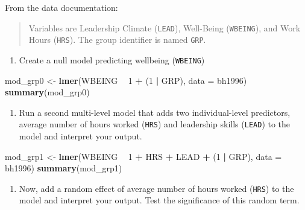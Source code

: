 \documentclass[]{book}
\newenvironment{Shaded}{\begin{snugshade}}{\end{snugshade}}
\newcommand{\DataTypeTok}[1]{\textcolor[rgb]{0.13,0.29,0.53}{#1}}
\newcommand{\DecValTok}[1]{\textcolor[rgb]{0.00,0.00,0.81}{#1}}
\newcommand{\KeywordTok}[1]{\textcolor[rgb]{0.13,0.29,0.53}{\textbf{#1}}}
\newcommand{\NormalTok}[1]{#1}
\newcommand{\OperatorTok}[1]{\textcolor[rgb]{0.81,0.36,0.00}{\textbf{#1}}}
\newcommand{\StringTok}[1]{\textcolor[rgb]{0.31,0.60,0.02}{#1}}
\providecommand{\tightlist}{%
  \setlength{\itemsep}{0pt}\setlength{\parskip}{0pt}}
\begin{document}
From the data documentation:

\begin{quote}
Variables are Leadership Climate (\texttt{LEAD}), Well-Being (\texttt{WBEING}), and Work Hours (\texttt{HRS}). The group identifier is named \texttt{GRP}.
\end{quote}

\begin{enumerate}
\def\labelenumi{\arabic{enumi}.}
\tightlist
\item
  Create a null model predicting wellbeing (\texttt{WBEING})
\end{enumerate}

\begin{Shaded}
\begin{Highlighting}[]
\NormalTok{  mod_grp0 <-}\StringTok{ }\KeywordTok{lmer}\NormalTok{(WBEING }\OperatorTok{~}\StringTok{ }\DecValTok{1} \OperatorTok{+}\StringTok{ }\NormalTok{(}\DecValTok{1} \OperatorTok{|}\StringTok{ }\NormalTok{GRP), }\DataTypeTok{data =}\NormalTok{ bh1996)}
  \KeywordTok{summary}\NormalTok{(mod_grp0)}
\end{Highlighting}
\end{Shaded}

\begin{enumerate}
\def\labelenumi{\arabic{enumi}.}
\setcounter{enumi}{2}
\tightlist
\item
  Run a second multi-level model that adds two individual-level predictors, average number of hours worked (\texttt{HRS}) and leadership skills (\texttt{LEAD}) to the model and interpret your output.
\end{enumerate}

\begin{Shaded}
\begin{Highlighting}[]
\NormalTok{  mod_grp1 <-}\StringTok{ }\KeywordTok{lmer}\NormalTok{(WBEING }\OperatorTok{~}\StringTok{ }\DecValTok{1} \OperatorTok{+}\StringTok{ }\NormalTok{HRS }\OperatorTok{+}\StringTok{ }\NormalTok{LEAD }\OperatorTok{+}\StringTok{ }\NormalTok{(}\DecValTok{1} \OperatorTok{|}\StringTok{ }\NormalTok{GRP), }\DataTypeTok{data =}\NormalTok{ bh1996)}
  \KeywordTok{summary}\NormalTok{(mod_grp1)}
\end{Highlighting}
\end{Shaded}

\begin{enumerate}
\def\labelenumi{\arabic{enumi}.}
\setcounter{enumi}{2}
\tightlist
\item
  Now, add a random effect of average number of hours worked (\texttt{HRS}) to the model and interpret your output. Test the significance of this random term.
\end{enumerate}
\end{document}
